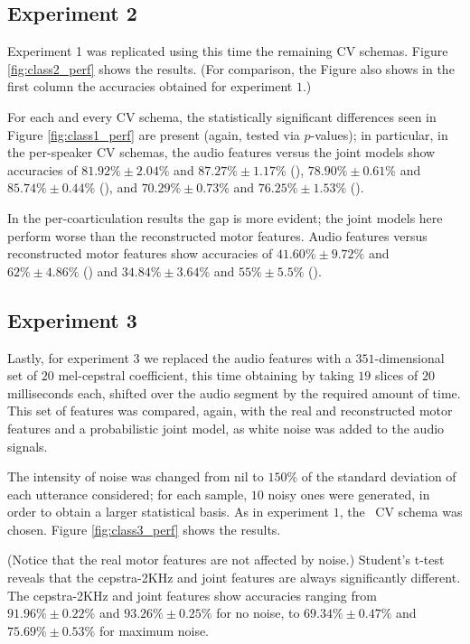 \subsection{Experiment 2}
\label{subsec:exp2}

Experiment 1 was replicated using this time the remaining CV schemas.
Figure \ref{fig:class2_perf} shows the results. (For comparison,
the Figure also shows in the first column the accuracies obtained for
experiment $1$.)

For each and every CV schema, the statistically significant differences seen in
Figure \ref{fig:class1_perf} are present (again, tested via $p$-values);
in particular, in the per-speaker CV schemas, the audio features versus
the joint models show accuracies of
$81.92\% \pm 2.04\%$ and $87.27\% \pm 1.17\%$ (\spka),
$78.90\% \pm 0.61\%$ and $85.74\% \pm 0.44\%$ (\spkb), and
$70.29\% \pm 0.73\%$ and $76.25\% \pm 1.53\%$ (\spkc).

In the per-coarticulation results the gap is more evident; the joint models
here perform worse than the reconstructed motor features. Audio features
versus reconstructed motor features show accuracies of
$41.60\% \pm 9.72\%$ and $62\% \pm 4.86\%$ (\coa) and
$34.84\% \pm 3.64\%$ and $55\% \pm 5.5\%$ (\cob).

\subsection{Experiment 3}
\label{subsec:exp3}

Lastly, for experiment 3 we replaced the audio features with
a $351$-dimensional set of $20$ mel-cepstral
coefficient, this time obtaining by taking $19$ slices of $20$ milliseconds each,
shifted over the audio segment by the required amount of time. This set of
features was compared, again, with the real and reconstructed motor features and
a probabilistic joint model, as white noise was added to the audio signals.

The intensity of noise was changed from nil to $150\%$ of the standard deviation
of each utterance considered; for each sample, $10$ noisy ones were generated, in
order to obtain a larger statistical basis. As in experiment $1$, the \overall\ CV
schema was chosen. Figure \ref{fig:class3_perf} shows the results.

(Notice that the real motor features are not affected by noise.) Student's t-test
reveals that the cepstra-2KHz and joint features are always significantly different.
The cepstra-2KHz and joint features show accuracies ranging from
$91.96\% \pm 0.22\%$ and $93.26\% \pm 0.25\%$ for no noise, to
$69.34\% \pm 0.47\%$ and $75.69\% \pm 0.53\%$ for maximum noise.
